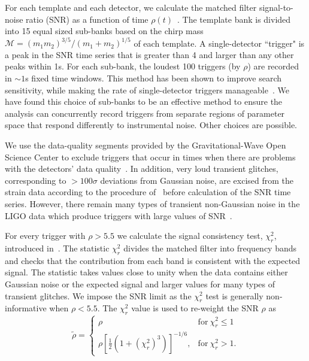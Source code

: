 For each template and each detector, we calculate the matched filter signal-to-noise ratio (SNR) as a function of time $\rho(t)$~\citep{Allen:2005fk}. The template bank is divided into 15 equal sized sub-banks based on the chirp mass $\mathcal{M} = (m_1m_2)^{3/5} / (m_1+m_2)^{1/5}$ of each template. A single-detector ``trigger" is a peak in the SNR time series that is greater than 4 and larger than any other peaks within 1s. For each sub-bank, the loudest 100 triggers (by $\rho$) are recorded in $\sim1$s fixed time windows. This method has been shown to improve search sensitivity, while making the rate of single-detector triggers manageable~\citep{Nitz:2018rgo}. We have found this choice of sub-banks to be an effective method to ensure the analysis can concurrently record triggers from separate regions of parameter space that respond differently to instrumental noise. Other choices are possible.

 We use the data-quality segments provided by the Gravitational-Wave Open Science Center to exclude triggers that occur in times when there are problems with the detectors' data quality~\citep{TheLIGOScientific:2016zmo,TheLIGOScientific:2017lwt}.
 In addition, very loud transient glitches, corresponding to $>100\sigma$ deviations from Gaussian noise, are excised from the strain data according to the procedure of~\cite{Usman:2015kfa} before calculation of the SNR time series. However, there remain many types of transient non-Gaussian noise in the LIGO data which produce triggers with large values of SNR~\citep{Nuttall:2015dqa,TheLIGOScientific:2016zmo,TheLIGOScientific:2017lwt}. 

 For every trigger with $\rho > 5.5$ we calculate the signal consistency test, $\chi^2_r$, introduced in~\cite{Allen:2004gu}. The statistic $\chi^2_r$ divides the matched filter into frequency bands and checks that the contribution from each band is consistent with the expected signal. The statistic takes values close to unity when the data contains either Gaussian noise or the expected signal and larger values for many types of transient glitches. We impose the SNR limit as the $\chi^2_r$ test is generally non-informative when $\rho < 5.5$. The $\chi^2_r$ value is used to re-weight the SNR $\rho$ as~\citep{Babak:2012zx}
%
\begin{equation}
 \tilde{\rho} = \begin{cases} 
        \rho & \mathrm{for}\ \chi^2_r \leq 1 \\
        \rho\left[ \frac{1}{2} \left(1 + \left(\chi^2_r\right)^3\right)\right]^{-1/6}, & 
        \mathrm{for}\ \chi^2_r > 1.
    \end{cases}
\end{equation}
%

